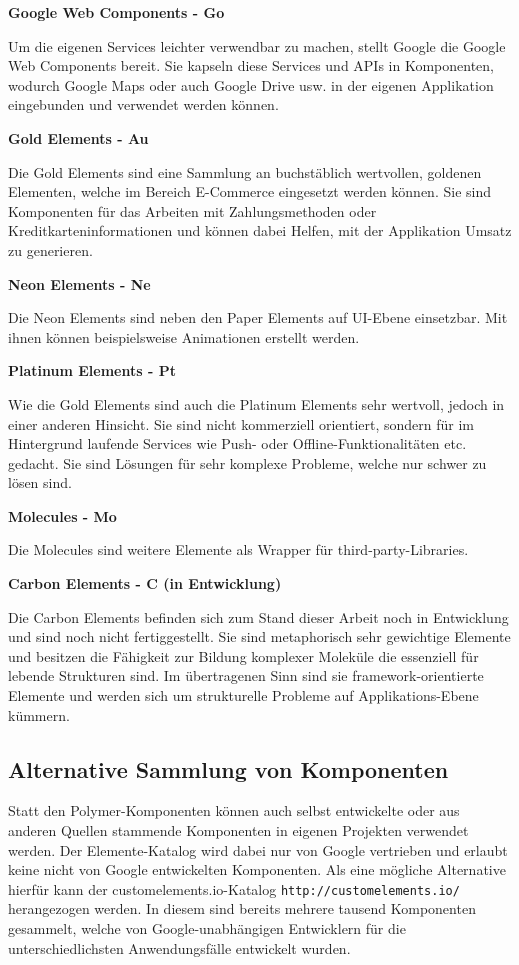 \textbf{Google Web Components - Go}

Um die eigenen Services leichter verwendbar zu machen, stellt Google die Google Web Components bereit. Sie kapseln diese Services und \ac{API}s in Komponenten, wodurch Google Maps oder auch Google Drive usw. in der eigenen Applikation eingebunden und verwendet werden können.

\textbf{Gold Elements - Au}

Die Gold Elements sind eine Sammlung an buchstäblich wertvollen, goldenen Elementen, welche im Bereich E-Commerce eingesetzt werden können. Sie sind Komponenten für das Arbeiten mit Zahlungsmethoden oder Kreditkarteninformationen und können dabei Helfen, mit der Applikation Umsatz zu generieren.

\textbf{Neon Elements - Ne}

Die Neon Elements sind neben den Paper Elements auf \ac{UI}-Ebene einsetzbar. Mit ihnen können beispielsweise Animationen erstellt werden.

\textbf{Platinum Elements - Pt}

Wie die Gold Elements sind auch die Platinum Elements sehr wertvoll, jedoch in einer anderen Hinsicht. Sie sind nicht kommerziell orientiert, sondern für im Hintergrund laufende Services wie Push- oder Offline-Funktionalitäten etc. gedacht. Sie sind Lösungen für sehr komplexe Probleme, welche nur schwer zu lösen sind.

\textbf{Molecules - Mo}

Die Molecules sind weitere Elemente als Wrapper für third-party-Libraries.

\textbf{Carbon Elements - C (in Entwicklung)}

Die Carbon Elements befinden sich zum Stand dieser Arbeit noch in Entwicklung und sind noch nicht fertiggestellt. Sie sind metaphorisch sehr gewichtige Elemente und besitzen die Fähigkeit zur Bildung komplexer Moleküle die essenziell für lebende Strukturen sind. Im übertragenen Sinn sind sie framework-orientierte Elemente und werden sich um strukturelle Probleme auf Applikations-Ebene kümmern.

\subsection{Alternative Sammlung von Komponenten}\label{alternative-sammlung-von-komponenten}

Statt den Polymer-Komponenten können auch selbst entwickelte oder aus anderen Quellen stammende Komponenten in eigenen Projekten verwendet werden. Der Elemente-Katalog wird dabei nur von Google vertrieben und erlaubt keine nicht von Google entwickelten Komponenten. Als eine mögliche Alternative hierfür kann der customelements.io-Katalog \texttt{http://customelements.io/} herangezogen werden. In diesem sind bereits mehrere tausend Komponenten gesammelt, welche von Google-unabhängigen Entwicklern für die unterschiedlichsten Anwendungsfälle entwickelt wurden.

